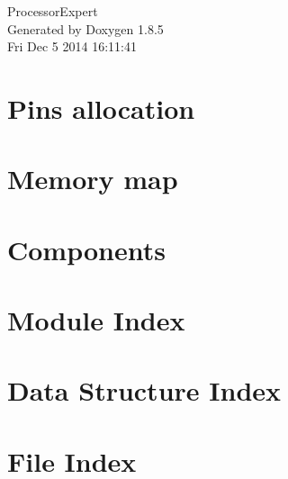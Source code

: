 \documentclass[twoside]{book}
\newcommand{\clearemptydoublepage}{%
  \newpage{\pagestyle{empty}\cleardoublepage}%
}
\begin{document}
\hypersetup{pageanchor=false}
\begin{titlepage}
\vspace*{7cm}
\begin{center}%
{\Large Processor\-Expert }\\
\vspace*{1cm}
{\large Generated by Doxygen 1.8.5}\\
\vspace*{0.5cm}
{\small Fri Dec 5 2014 16:11:41}\\
\end{center}
\end{titlepage}
\clearemptydoublepage
\tableofcontents
\clearemptydoublepage
{}
\hypersetup{pageanchor=true}

\chapter{Pins allocation}
\label{page_pinalloc}
\hypertarget{page_pinalloc}{}

\chapter{Memory map}
\label{page_memorymap}
\hypertarget{page_memorymap}{}

\chapter{Components}
\label{page_components}
\hypertarget{page_components}{}

\chapter{Module Index}

\chapter{Data Structure Index}

\chapter{File Index}

\end{document}
